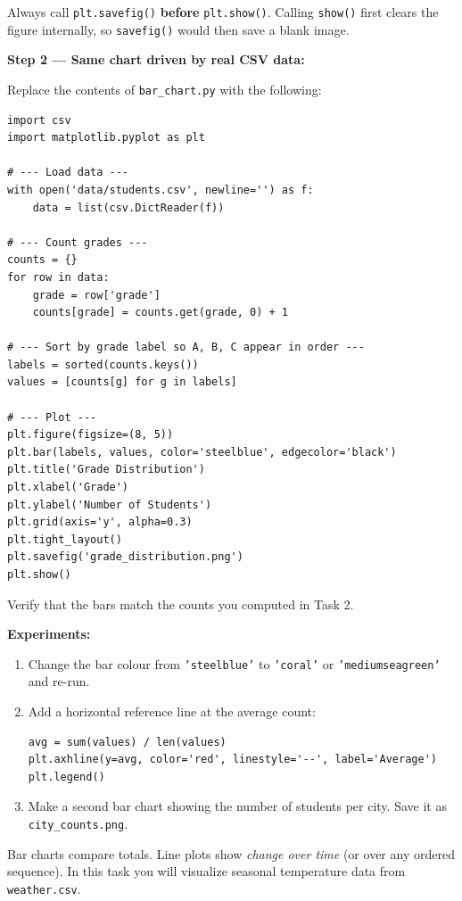 \documentclass{cslab}
\begin{document}
\begin{warning}
Always call \texttt{plt.savefig()} \textbf{before} \texttt{plt.show()}. Calling \texttt{show()} first clears the figure internally, so \texttt{savefig()} would then save a blank image.
\end{warning}

\textbf{Step 2 --- Same chart driven by real CSV data:}

Replace the contents of \texttt{bar\_chart.py} with the following:

\begin{lstlisting}
import csv
import matplotlib.pyplot as plt

# --- Load data ---
with open('data/students.csv', newline='') as f:
    data = list(csv.DictReader(f))

# --- Count grades ---
counts = {}
for row in data:
    grade = row['grade']
    counts[grade] = counts.get(grade, 0) + 1

# --- Sort by grade label so A, B, C appear in order ---
labels = sorted(counts.keys())
values = [counts[g] for g in labels]

# --- Plot ---
plt.figure(figsize=(8, 5))
plt.bar(labels, values, color='steelblue', edgecolor='black')
plt.title('Grade Distribution')
plt.xlabel('Grade')
plt.ylabel('Number of Students')
plt.grid(axis='y', alpha=0.3)
plt.tight_layout()
plt.savefig('grade_distribution.png')
plt.show()
\end{lstlisting}

Verify that the bars match the counts you computed in Task 2.

\textbf{Experiments:}
\begin{enumerate}
    \item Change the bar colour from \texttt{'steelblue'} to \texttt{'coral'} or \texttt{'mediumseagreen'} and re-run.
    \item Add a horizontal reference line at the average count:
\begin{lstlisting}
avg = sum(values) / len(values)
plt.axhline(y=avg, color='red', linestyle='--', label='Average')
plt.legend()
\end{lstlisting}
    \item Make a second bar chart showing the number of students per city. Save it as \texttt{city\_counts.png}.
\end{enumerate}


Bar charts compare totals. Line plots show \emph{change over time} (or over any ordered sequence). In this task you will visualize seasonal temperature data from \texttt{weather.csv}.
\end{document}
